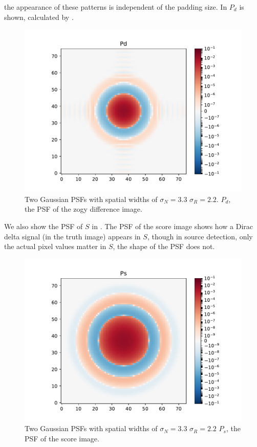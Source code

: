 \documentclass[11pt]{article}
\begin{document}
the appearance of these patterns is independent of the padding
size.
%
In  \(P_d\) is shown, calculated by .
\begin{figure}
\begin{center}
\includegraphics[width=5.5in]{fig/twoG_defaults_Pd.pdf}
\end{center}
\caption{\label{fig:twoG_pd}Two Gaussian PSFs with spatial widths of
  \(\sigma_N = 3.3\) \(\sigma_R = 2.2\). \(P_d\), the PSF of the zogy
  difference image.}
\end{figure}
We also show the PSF of \(S\) in . The PSF of the
score image shows how a Dirac delta signal (in the truth image)
appears in \(S\), though in source detection, only the actual pixel
values matter in \(S\), the shape of the PSF does not.
\begin{figure}
  \begin{center}
    \includegraphics[width=5.5in]{fig/twoG_defaults_Ps.pdf}
  \end{center}
\caption{\label{fig:twoG_ps}Two Gaussian PSFs with spatial widths of
  \(\sigma_N = 3.3\) \(\sigma_R = 2.2\) \(P_s\), the PSF of the score
  image.}
\end{figure}
\end{document}
